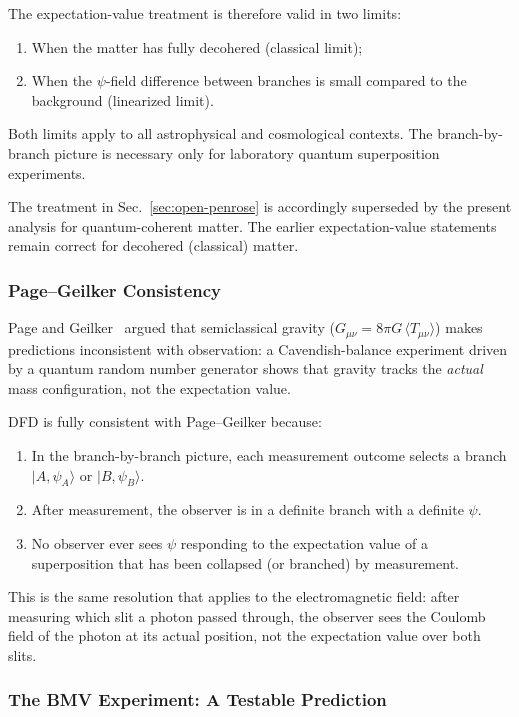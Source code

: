 The expectation-value treatment is therefore valid in two limits:
\begin{enumerate}
\item When the matter has fully decohered (classical limit);
\item When the $\psi$-field difference between branches is small compared to the background (linearized limit).
\end{enumerate}
Both limits apply to all astrophysical and cosmological contexts.  The branch-by-branch picture is necessary only for laboratory quantum superposition experiments.

The treatment in Sec.~\ref{sec:open-penrose} is accordingly superseded by the present analysis for quantum-coherent matter.  The earlier expectation-value statements remain correct for decohered (classical) matter.

\subsubsection{Page--Geilker Consistency}\label{sec:page-geilker}

Page and Geilker~\cite{PageGeilker1981} argued that semiclassical gravity ($G_{\mu\nu} = 8\pi G\,\langle T_{\mu\nu}\rangle$) makes predictions inconsistent with observation: a Cavendish-balance experiment driven by a quantum random number generator shows that gravity tracks the \emph{actual} mass configuration, not the expectation value.

DFD is fully consistent with Page--Geilker because:
\begin{enumerate}
\item In the branch-by-branch picture, each measurement outcome selects a branch $|A,\psi_A\rangle$ or $|B,\psi_B\rangle$.
\item After measurement, the observer is in a definite branch with a definite $\psi$.
\item No observer ever sees $\psi$ responding to the expectation value of a superposition that has been collapsed (or branched) by measurement.
\end{enumerate}

This is the same resolution that applies to the electromagnetic field: after measuring which slit a photon passed through, the observer sees the Coulomb field of the photon at its actual position, not the expectation value over both slits.

\subsubsection{The BMV Experiment: A Testable Prediction}\label{sec:bmv-prediction}

